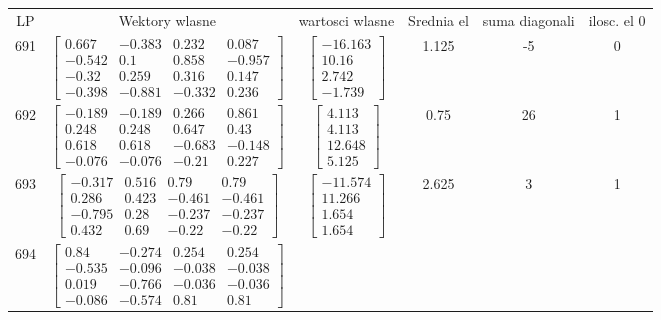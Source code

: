\documentclass[a4paper,12pt]{article}
\begin{document}
\bgroup {} \vspace{0.2in} \begin{tabular}{c c c c c c}
LP &Wektory wlasne & wartosci wlasne & Srednia el & suma diagonali & ilosc. el 0\\
691
&
$\begin{bmatrix} 0.667 & -0.383 & 0.232 & 0.087 \\ -0.542 & 0.1 & 0.858 & -0.957 \\ -0.32 & 0.259 & 0.316 & 0.147 \\ -0.398 & -0.881 & -0.332 & 0.236 \end{bmatrix}$
&
$\begin{bmatrix} -16.163 \\ 10.16 \\ 2.742 \\ -1.739 \end{bmatrix}$
&
1.125
&
-5
&
0
\\
692
&
$\begin{bmatrix} -0.189 & -0.189 & 0.266 & 0.861 \\ 0.248 & 0.248 & 0.647 & 0.43 \\ 0.618 & 0.618 & -0.683 & -0.148 \\ -0.076 & -0.076 & -0.21 & 0.227 \end{bmatrix}$
&
$\begin{bmatrix} 4.113 \\ 4.113 \\ 12.648 \\ 5.125 \end{bmatrix}$
&
0.75
&
26
&
1
\\
693
&
$\begin{bmatrix} -0.317 & 0.516 & 0.79 & 0.79 \\ 0.286 & 0.423 & -0.461 & -0.461 \\ -0.795 & 0.28 & -0.237 & -0.237 \\ 0.432 & 0.69 & -0.22 & -0.22 \end{bmatrix}$
&
$\begin{bmatrix} -11.574 \\ 11.266 \\ 1.654 \\ 1.654 \end{bmatrix}$
&
2.625
&
3
&
1
\\
694
&
$\begin{bmatrix} 0.84 & -0.274 & 0.254 & 0.254 \\ -0.535 & -0.096 & -0.038 & -0.038 \\ 0.019 & -0.766 & -0.036 & -0.036 \\ -0.086 & -0.574 & 0.81 & 0.81 \end{bmatrix}$

\end{tabular}
\end{document}
